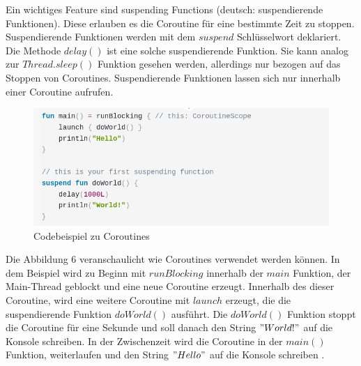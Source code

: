 \documentclass{article}
\begin{document}
Ein wichtiges Feature sind suspending Functions (deutsch: suspendierende Funktionen). Diese erlauben es die Coroutine für eine bestimmte Zeit zu stoppen. Suspendierende Funktionen werden mit dem $suspend$ Schlüsselwort deklariert. Die Methode $delay()$ ist eine solche suspendierende Funktion. Sie kann analog zur $Thread.sleep()$ Funktion gesehen werden, allerdings nur bezogen auf das Stoppen von Coroutines. Suspendierende Funktionen lassen sich nur innerhalb einer Coroutine aufrufen. \cite{KotlinLangDocCoroutines}

\begin{figure}[!htb]
    \centering
    \includegraphics[width=0.9\columnwidth]{img/Coroutine.png}
    \caption{Codebeispiel zu Coroutines\footnotemark}
\end{figure}

Die Abbildung 6 veranschaulicht wie Coroutines verwendet werden können. In dem Beispiel wird zu Beginn mit $runBlocking$ innerhalb der $main$ Funktion, der Main-Thread geblockt und eine neue Coroutine erzeugt. Innerhalb des  dieser Coroutine, wird eine weitere Coroutine mit $launch$ erzeugt, die die suspendierende Funktion $doWorld()$ ausführt. Die $doWorld()$ Funktion stoppt die Coroutine für eine Sekunde und soll danach den String $"World!"$ auf die Konsole schreiben. In der Zwischenzeit wird die Coroutine in der $main()$ Funktion, weiterlaufen und den String $"Hello"$ auf die Konsole schreiben \cite{KotlinLangDocCoroutines}.
\end{document}
